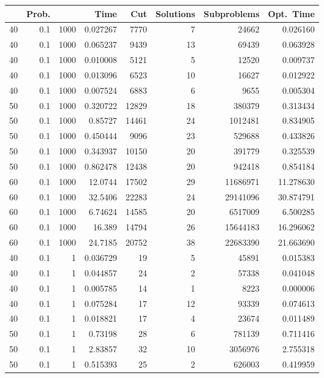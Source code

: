 \documentclass[a4paper,11pt]{article}
\begin{document}
\begin{table}
\begin{center}
\begin{tabular}{|rrr|r|r|rr|r|}
\hline
 & Prob. &  & Time & Cut & Solutions & Subproblems & Opt.\ Time \\
\hline
40 & 0.1 & 1000 & 0.027267 & 7770 & 7 & 24662 & 0.026160 \\
40 & 0.1 & 1000 & 0.065237 & 9439 & 13 & 69439 & 0.063928 \\
40 & 0.1 & 1000 & 0.010008 & 5121 & 5 & 12520 & 0.009737 \\
40 & 0.1 & 1000 & 0.013096 & 6523 & 10 & 16627 & 0.012922 \\
40 & 0.1 & 1000 & 0.007524 & 6883 & 6 & 9655 & 0.005304 \\
50 & 0.1 & 1000 & 0.320722 & 12829 & 18 & 380379 & 0.313434 \\
50 & 0.1 & 1000 & 0.85727 & 14461 & 24 & 1012481 & 0.834905 \\
50 & 0.1 & 1000 & 0.450444 & 9096 & 23 & 529688 & 0.433826 \\
50 & 0.1 & 1000 & 0.343937 & 10150 & 20 & 391779 & 0.325539 \\
50 & 0.1 & 1000 & 0.862478 & 12438 & 20 & 942418 & 0.854184 \\
60 & 0.1 & 1000 & 12.0744 & 17502 & 29 & 11686971 & 11.278630 \\
60 & 0.1 & 1000 & 32.5406 & 22283 & 24 & 29141096 & 30.874791 \\
60 & 0.1 & 1000 & 6.74624 & 14585 & 20 & 6517009 & 6.500285 \\
60 & 0.1 & 1000 & 16.389 & 14794 & 26 & 15644183 & 16.296062 \\
60 & 0.1 & 1000 & 24.7185 & 20752 & 38 & 22683390 & 21.663690 \\
\hline
40 & 0.1 & 1 & 0.036729 & 19 & 5 & 45891 & 0.015383 \\
40 & 0.1 & 1 & 0.044857 & 24 & 2 & 57338 & 0.041048 \\
40 & 0.1 & 1 & 0.005785 & 14 & 1 & 8223 & 0.000006 \\
40 & 0.1 & 1 & 0.075284 & 17 & 12 & 93339 & 0.074613 \\
40 & 0.1 & 1 & 0.018821 & 17 & 4 & 23674 & 0.011489 \\
50 & 0.1 & 1 & 0.73198 & 28 & 6 & 781139 & 0.711416 \\
50 & 0.1 & 1 & 2.83857 & 32 & 10 & 3056976 & 2.755318 \\
50 & 0.1 & 1 & 0.515393 & 25 & 2 & 626003 & 0.419959 \\

\end{tabular}
\end{center}
\end{table}
\end{document}
